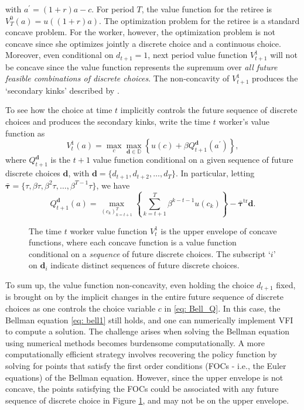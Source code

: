 \documentclass[12pt]{article}
\newcommand{\DChSet}{\mathbb{D}}
\begin{document}
%
with $a^{\prime} = (1+r)a - c$. For period $T$, the value function for the retiree is $V_{T}^{0}(a) = u((1+r)a)$. The optimization problem for the retiree is a standard concave problem. For the worker, however, the optimization problem is not concave since she optimizes jointly a discrete choice and a continuous choice. Moreover, even conditional on $d_{t+1} = 1$, next period value function $V_{t+1}^{1}$ will not be concave since the value function represents the supremum over \textit{all future feasible combinations of discrete choices}. The non-concavity of $V_{t+1}^{1}$ produces the `secondary kinks' described by \cite{Iskhakov2017}. 

To see how the choice at time $t$ implicitly controls the future sequence of discrete choices and produces the secondary kinks, write the time $t$ worker's value function as
%
\begin{equation}\label{eq: Bell_Q}
        V_{t}^{1}(a) = \max_{c}\max_{\textbf{d}\in \DChSet} \left\{u(c) + \beta Q_{t+1}^{\textbf{d}}(a^{\prime})\right\},
\end{equation}
%
where $Q_{t+1}^{\textbf{d}}$ is the $t+1$ value function conditional on a given sequence of future discrete choices $\textbf{d}$, with $\textbf{d} = \{d_{t+1}, d_{t+2},\dots,d_{T}\}$. In particular, letting $\boldsymbol{\bar{\tau}} = \{\tau, \beta\tau,\beta^{2}\tau,\dots,\beta^{T-1}\tau\}$, we have
%
\begin{equation}
    Q_{t+1}^{\textbf{d}}(a) = \max_{(c_{k})_{k=t+1}^{T}}\left\{\sum_{k=t+1}^{T}\beta^{k-t-1}u(c_{k})\right\} - \boldsymbol{\bar{\tau}}^{\text{tr}}\textbf{d}.
\end{equation}
%
\begin{figure}[htb!]
    \centering
    \captionsetup{width=.7\linewidth}
    
    \caption{The time $t$ worker value function $V_{t}^{1}$ is the upper envelope of concave functions, where each concave function is a value function conditional on a \textit{sequence} of future discrete choices. The subscript `$i$' on $\mathbf{d}_{i}$ indicate distinct sequences of future discrete choices.}
    \label{fig: concav_env}
  \end{figure}

To sum up, the value function non-concavity, even holding the choice $d_{t+1}$ fixed, is brought on by the implicit changes in the entire future sequence of discrete choices as one controls the choice variable $c$ in \eqref{eq: Bell_Q}. In this case, the Bellman equation \eqref{eq: bell1} still holds, and one can numerically implement VFI to compute a solution. The challenge arises when solving the Bellman equation using numerical methods becomes burdensome computationally. A more computationally efficient strategy involves recovering the policy function by solving for points that satisfy the first order conditions (FOCs - i.e., the Euler equations) of the Bellman equation. However, since the upper envelope is not concave, the points satisfying the FOCs could be associated with any future sequence of discrete choice in Figure \ref{fig: concav_env}, and may not be on the upper envelope.
\end{document}
